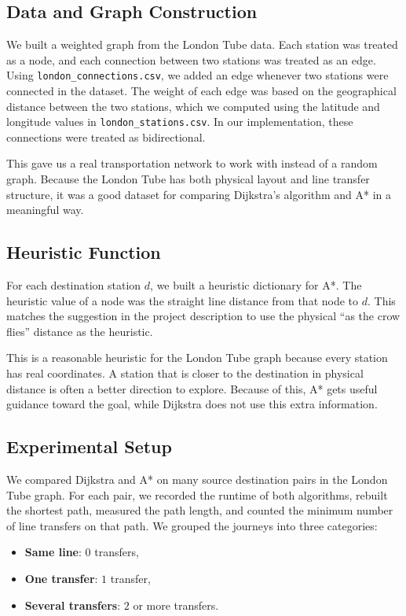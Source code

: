 \documentclass[letterpaper]{article}
\theoremstyle{plain}
\theoremstyle{definition}
\theoremstyle{remark}
\begin{document}
\subsection*{Data and Graph Construction}
We built a weighted graph from the London Tube data. Each station was treated as a node, and each 
connection between two stations was treated as an edge. Using \texttt{london\_connections.csv}, we added 
an edge whenever two stations were connected in the dataset. The weight of each edge was based on the 
geographical distance between the two stations, which we computed using the latitude and longitude 
values in \texttt{london\_stations.csv}. In our implementation, these connections were treated as bidirectional.

This gave us a real transportation network to work with instead of a random graph. Because the London Tube 
has both physical layout and line transfer structure, it was a good dataset for comparing Dijkstra's 
algorithm and A* in a meaningful way.

\subsection*{Heuristic Function}
For each destination station \(d\), we built a heuristic dictionary for A*. The heuristic value of a node 
was the straight line distance from that node to \(d\). This matches the suggestion in the project 
description to use the physical ``as the crow flies'' distance as the heuristic.

This is a reasonable heuristic for the London Tube graph because every station has real coordinates. A station 
that is closer to the destination in physical distance is often a better direction to explore. Because of 
this, A* gets useful guidance toward the goal, while Dijkstra does not use this extra information.

\subsection*{Experimental Setup}
We compared Dijkstra and A* on many source destination pairs in the London Tube graph. For each pair, we 
recorded the runtime of both algorithms, rebuilt the shortest path, measured the path length, and counted 
the minimum number of line transfers on that path. We grouped the journeys into three categories:
\begin{itemize}
    \item \textbf{Same line}: \(0\) transfers,
    \item \textbf{One transfer}: \(1\) transfer,
    \item \textbf{Several transfers}: \(2\) or more transfers.
\end{itemize}
\end{document}
